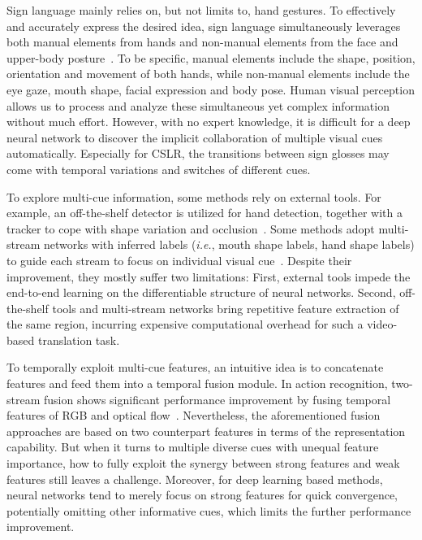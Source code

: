 \documentclass[letterpaper]{article} %
\begin{document}
Sign language mainly relies on, but not limits to, hand gestures.
To effectively and accurately express the desired idea, sign language simultaneously leverages both manual elements from hands and non-manual elements from the face and upper-body posture~\cite{phoenixdataset2014}.
To be specific, manual elements include the shape, position, orientation and movement of both hands,
while non-manual elements include the eye gaze, mouth shape, facial expression and body pose.
Human visual perception allows us to process and analyze these simultaneous yet complex information without much effort.
However, with no expert knowledge, it is difficult for a deep neural network to discover the implicit collaboration of multiple visual cues automatically.
Especially for CSLR, the transitions between sign glosses may come with temporal variations and switches of different cues.


To explore multi-cue information, some methods rely on external tools.
For example, an off-the-shelf detector is utilized for hand detection, together with a tracker to cope with shape variation and occlusion~\cite{subunet,han}.
Some methods adopt multi-stream networks with inferred labels (\emph{i.e.}, mouth shape labels, hand shape labels) to guide each stream to focus on individual visual cue~\cite{tpami19}.
Despite their improvement, they mostly suffer two limitations:
First, external tools impede the end-to-end learning on the differentiable structure of neural networks.
Second, off-the-shelf tools and multi-stream networks bring repetitive feature extraction of the same region, incurring expensive computational overhead for such a video-based translation task.


To temporally exploit multi-cue features, an intuitive idea is to concatenate features and feed them into a temporal fusion module. In action recognition, two-stream fusion shows significant performance improvement by fusing temporal features of RGB and optical flow~\cite{vgg-two-stream,vgg-two-stream-2}.
Nevertheless, the aforementioned fusion approaches are based on two counterpart features in terms of the representation capability.
But when it turns to multiple diverse cues with unequal feature importance, how to fully exploit the synergy between strong features and weak features still leaves a challenge.
Moreover, for deep learning based methods, neural networks tend to merely focus on strong features for quick convergence, potentially omitting other informative cues, which limits the further performance improvement.
\end{document}
